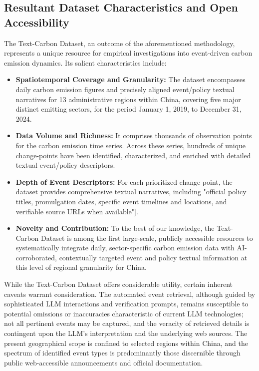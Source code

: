\subsection{Resultant Dataset Characteristics and Open Accessibility} 
\label{subsec:DatasetChar}
The Text-Carbon Dataset, an outcome of the aforementioned methodology, represents a unique resource for empirical investigations into event-driven carbon emission dynamics. Its salient characteristics include:
\begin{itemize}
\item \textbf{Spatiotemporal Coverage and Granularity:} The dataset encompasses daily carbon emission figures and precisely aligned event/policy textual narratives for 13 administrative regions within China, covering five major distinct emitting sectors, for the period January 1, 2019, to December 31, 2024.
\item \textbf{Data Volume and Richness:} It comprises thousands of observation points for the carbon emission time series. Across these series, hundreds of unique change-points have been identified, characterized, and enriched with detailed textual event/policy descriptors.
\item \textbf{Depth of Event Descriptors:} For each prioritized change-point, the dataset provides comprehensive textual narratives, including "official policy titles, promulgation dates, specific event timelines and locations, and verifiable source URLs when available"].
\item \textbf{Novelty and Contribution:} To the best of our knowledge, the Text-Carbon Dataset is among the first large-scale, publicly accessible resources to systematically integrate daily, sector-specific carbon emission data with AI-corroborated, contextually targeted event and policy textual information at this level of regional granularity for China.
\end{itemize}

While the Text-Carbon Dataset offers considerable utility, certain inherent caveats warrant consideration. The automated event retrieval, although guided by sophisticated LLM interactions and verification prompts, remains susceptible to potential omissions or inaccuracies characteristic of current LLM technologies; not all pertinent events may be captured, and the veracity of retrieved details is contingent upon the LLM's interpretation and the underlying web sources. The present geographical scope is confined to selected regions within China, and the spectrum of identified event types is predominantly those discernible through public web-accessible announcements and official documentation.